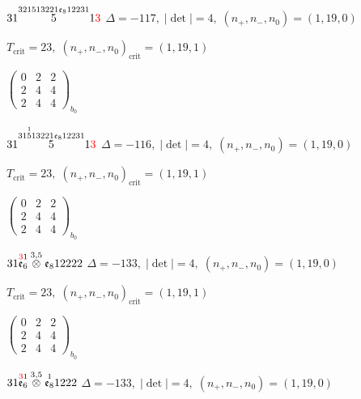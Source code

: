 \documentclass[10pt]{article}
\begin{document}
$31\overset{321513221\mathfrak{e}_812231}{5}1\textcolor{red}{3}$ \quad $\Delta=-117,\; |\det|=4,\; (n_+,n_-,n_0)=(1,19,0)$

\hspace{1em}$T_{\text{crit}}=23,\; (n_+,n_-,n_0)_{\text{crit}}=(1,19,1)$

\hspace{2em}$\left(\begin{smallmatrix}0 & 2 & 2 \\ 2 & 4 & 4 \\ 2 & 4 & 4\end{smallmatrix}\right)_{\!b_0}$

\smallskip

$31\overset{31\overset{1}{5}13221\mathfrak{e}_812231}{5}1\textcolor{red}{3}$ \quad $\Delta=-116,\; |\det|=4,\; (n_+,n_-,n_0)=(1,19,0)$

\hspace{1em}$T_{\text{crit}}=23,\; (n_+,n_-,n_0)_{\text{crit}}=(1,19,1)$

\hspace{2em}$\left(\begin{smallmatrix}0 & 2 & 2 \\ 2 & 4 & 4 \\ 2 & 4 & 4\end{smallmatrix}\right)_{\!b_0}$

\smallskip

$31\overset{\textcolor{red}{3}1}{\mathfrak{e}_6}\overset{3,5}{\otimes}\mathfrak{e}_812222$ \quad $\Delta=-133,\; |\det|=4,\; (n_+,n_-,n_0)=(1,19,0)$

\hspace{1em}$T_{\text{crit}}=23,\; (n_+,n_-,n_0)_{\text{crit}}=(1,19,1)$

\hspace{2em}$\left(\begin{smallmatrix}0 & 2 & 2 \\ 2 & 4 & 4 \\ 2 & 4 & 4\end{smallmatrix}\right)_{\!b_0}$

\smallskip

$31\overset{\textcolor{red}{3}1}{\mathfrak{e}_6}\overset{3,5}{\otimes}\overset{1}{\mathfrak{e}_8}1222$ \quad $\Delta=-133,\; |\det|=4,\; (n_+,n_-,n_0)=(1,19,0)$
\end{document}
